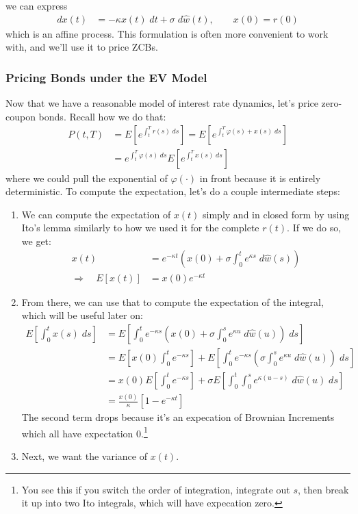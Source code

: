\documentclass[a4paper,12pt]{scrartcl}
\begin{document}
we can express
\begin{align*}
    dx(t) &= -\kappa x(t) \; dt + \sigma \; d\hat{w}(t), 
    \qquad x(0) = r(0)
\end{align*}
which is an affine process. This formulation is often more convenient
to work with, and we'll use it to price ZCBs.

\newpage
\subsubsection{Pricing Bonds under the EV Model}

Now that we have a reasonable model of interest rate dynamics, let's
price zero-coupon bonds. Recall how we do that:
\begin{align*}
   P(t,T) &= E\left[e^{ \int^T_t r(s) \; ds } \right] = 
      E\left[e^{ \int^T_t \varphi(s) + x(s) \; ds } \right]  \\
   &= e^{ \int^T_t \varphi(s) \; ds } 
      E\left[e^{ \int^T_t x(s) \; ds } \right]  
\end{align*}
where we could pull the exponential of $\varphi(\cdot)$ in front
because it is entirely deterministic. To compute the expectation,
let's do a couple intermediate steps:
\begin{enumerate}
   \item We can compute the expectation of $x(t)$ simply and in closed
      form by using Ito's lemma similarly to how we used it for
      the complete $r(t)$. If we do so, we get:
      \begin{align*}
	 x(t) &= e^{-\kappa t} \left( x(0) +  \sigma \int^t_0
	    e^{\kappa s} \; d\hat{w}(s)\right) \\
	 \Rightarrow \quad E[x(t)] &= x(0) e^{-\kappa t}
      \end{align*}
   \item From there, we can use that to compute the expectation of the
      integral, which will be useful
      later on:
      \begin{align*} 
	 E\left[\int^t_0 x(s) \; ds\right] &= 
	    E\left[ \int^t_0 
	       e^{-\kappa s} \left( x(0) +  \sigma \int^s_0
	       e^{\kappa u} \; d\hat{w}(u)\right) \; ds\right]\\
	 &= E\left[ x(0) \int^t_0  e^{-\kappa s} \right] +
	    E\left[ \int^t_0 
	       e^{-\kappa s} \left(\sigma \int^s_0
	       e^{\kappa u} \; d\hat{w}(u)\right) \; ds\right]\\
	 &= x(0) E\left[ \int^t_0  e^{-\kappa s} \right] +
	    \sigma E\left[ \int^t_0 
	       \int^s_0
	       e^{\kappa (u-s)} \; d\hat{w}(u) \; ds\right] \\
	 &= \frac{x(0)}{\kappa} \left[ 1- e^{-\kappa t}\right]
      \end{align*}
      The second term drops because it's an expecation of Brownian 
      Increments which all have expectation 0.\footnote{You see this 
      if you switch the order of integration, integrate out $s$, then 
      break it up into two Ito integrals, which will have expecation 
      zero.}
   \item Next, we want the variance of $x(t)$.

\end{enumerate}
\end{document}
